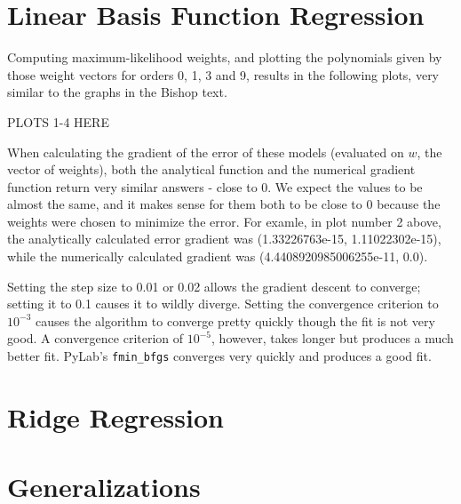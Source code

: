 \documentclass{paper}
\begin{document}
\section{Linear Basis Function Regression}

Computing maximum-likelihood weights, and plotting the polynomials given by those weight vectors for orders 0, 1, 3 and 9, results in the following plots, very similar to the graphs in the Bishop text.

PLOTS 1-4 HERE

When calculating the gradient of the error of these models (evaluated on $w$, the vector of weights), both the analytical function and the numerical gradient function return very similar answers - close to 0. We expect the values to be almost the same, and it makes sense for them both to be close to 0 because the weights were chosen to minimize the error. For examle, in plot number 2 above, the analytically calculated error gradient was (1.33226763e-15, 1.11022302e-15), while the numerically calculated gradient was (4.4408920985006255e-11, 0.0).

Setting the step size to 0.01 or 0.02 allows the gradient descent to converge; setting it to 0.1 causes it to wildly diverge. Setting the convergence criterion to $10^{-3}$ causes the algorithm to converge pretty quickly though the fit is not very good. A convergence criterion of $10^{-5}$, however, takes longer but produces a much better fit. PyLab's \texttt{fmin\_bfgs} converges very quickly and produces a good fit.

\section{Ridge Regression}



\section{Generalizations}
\end{document}
